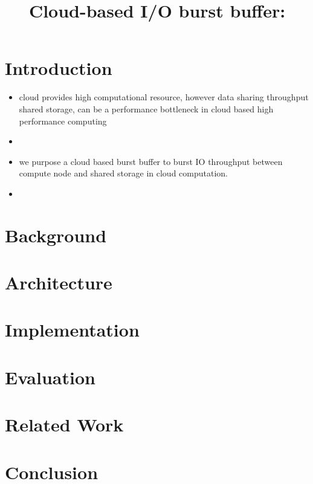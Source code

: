 \documentclass{article}
\begin{document}
\title{Cloud-based I/O burst buffer:}
\maketitle

\section{Introduction}
\begin{itemize}
	\item cloud provides high computational resource, however data sharing throughput shared storage, can be a performance bottleneck in cloud based high performance computing
	\item 
	\item we purpose a cloud based burst buffer to burst IO throughput between compute node and shared storage in cloud computation.
	\item 
\end{itemize}

\section{Background}

\section{Architecture}

\section{Implementation}

\section{Evaluation}

\section{Related Work}

\section{Conclusion}
\end{document}
